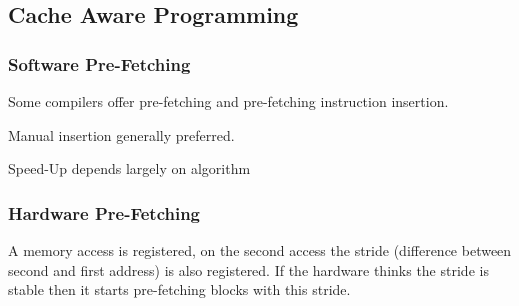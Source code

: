 	\subsection{Cache Aware Programming}
		\subsubsection{Software Pre-Fetching }
			\begin{compactitem}
			  \item Some compilers offer pre-fetching and pre-fetching instruction insertion.
			  \item Manual insertion generally preferred.
			  \item Speed-Up depends largely on algorithm
			\end{compactitem}
			
			\begin{multicols}{2}
				
			\end{multicols}
		
		\subsubsection{Hardware Pre-Fetching }
			A memory access is registered, on the second access the stride (difference between second and first address) is also registered. If the hardware thinks the stride is stable then it starts pre-fetching blocks with this stride.
			
